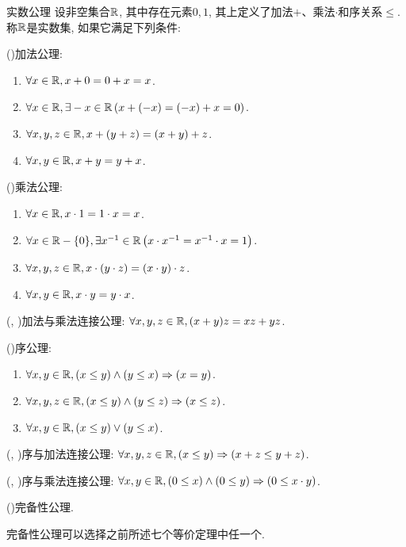 \begin{axiom}{实数公理}
	设非空集合$\mathbb{R}$, 其中存在元素$0, 1$, 其上定义了加法$+$、乘法$\cdot$和序关系$\leq$.称$\mathbb{R}$是实数集, 如果它满足下列条件: 
	
	(\uppercase\expandafter{})加法公理: 
	\begin{enumerate}
		\item $\forall x \in \mathbb{R} , x+0=0+x=x$.
		\item $\forall x \in \mathbb{R} , \exists -x \in \mathbb{R} \left( x+(-x)=(-x)+x=0 \right)$.
		\item $\forall x, y, z \in \mathbb{R} , x+(y+z)=(x+y)+z$.
		\item $\forall x, y \in \mathbb{R} , x+y=y+x$.
	\end{enumerate}
	
	(\uppercase\expandafter{})乘法公理: 
	\begin{enumerate}
		\item $\forall x \in \mathbb{R} , x \cdot 1=1 \cdot x=x$.
		\item $\forall x \in \mathbb{R} -\{ 0 \} , \exists x^{-1} \in \mathbb{R} \left( x \cdot x^{-1} =x^{-1} \cdot x=1 \right)$.
		\item $\forall x, y, z \in \mathbb{R} , x \cdot (y \cdot z)=(x \cdot y) \cdot z$.
		\item $\forall x, y \in \mathbb{R} , x\cdot y=y\cdot x$.
	\end{enumerate}
	
	(\uppercase\expandafter{}, \uppercase\expandafter{})加法与乘法连接公理: $\forall x, y, z \in \mathbb{R} , (x+y)z=xz+yz$.
	
	(\uppercase\expandafter{})序公理: 
	\begin{enumerate}
		\item $\forall x, y \in \mathbb{R} , (x \leq y) \wedge (y \leq x) \Rightarrow (x=y)$.
		\item $\forall x, y, z \in \mathbb{R} , (x \leq y) \wedge (y \leq z) \Rightarrow (x \leq z)$.
		\item $\forall x, y \in \mathbb{R} , (x \leq y) \vee (y \leq x)$.
	\end{enumerate}
	
	(\uppercase\expandafter{}, \uppercase\expandafter{})序与加法连接公理: $\forall x, y, z \in \mathbb{R} , (x \leq y)\Rightarrow (x+z \leq y+z)$.
	
	(\uppercase\expandafter{}, \uppercase\expandafter{})序与乘法连接公理: $\forall x, y \in \mathbb{R} , (0\leq x) \wedge (0 \leq y) \Rightarrow (0 \leq x \cdot y)$.
	
	(\uppercase\expandafter{})完备性公理.
\end{axiom}
\begin{remark}
	完备性公理可以选择之前所述七个等价定理中任一个.
\end{remark}

